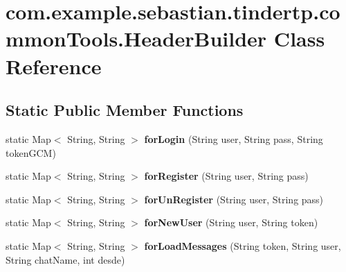 \hypertarget{classcom_1_1example_1_1sebastian_1_1tindertp_1_1commonTools_1_1HeaderBuilder}{}\section{com.\+example.\+sebastian.\+tindertp.\+common\+Tools.\+Header\+Builder Class Reference}
\label{classcom_1_1example_1_1sebastian_1_1tindertp_1_1commonTools_1_1HeaderBuilder}
\subsection*{Static Public Member Functions}
\begin{DoxyCompactItemize}
\item 
static Map$<$ String, String $>$ {\bfseries for\+Login} (String user, String pass, String token\+G\+CM)\hypertarget{classcom_1_1example_1_1sebastian_1_1tindertp_1_1commonTools_1_1HeaderBuilder_a7575f450c10545951cee7368e2978b8a}{}\label{classcom_1_1example_1_1sebastian_1_1tindertp_1_1commonTools_1_1HeaderBuilder_a7575f450c10545951cee7368e2978b8a}

\item 
static Map$<$ String, String $>$ {\bfseries for\+Register} (String user, String pass)\hypertarget{classcom_1_1example_1_1sebastian_1_1tindertp_1_1commonTools_1_1HeaderBuilder_aca86d388674ec18b8442236880026ffc}{}\label{classcom_1_1example_1_1sebastian_1_1tindertp_1_1commonTools_1_1HeaderBuilder_aca86d388674ec18b8442236880026ffc}

\item 
static Map$<$ String, String $>$ {\bfseries for\+Un\+Register} (String user, String pass)\hypertarget{classcom_1_1example_1_1sebastian_1_1tindertp_1_1commonTools_1_1HeaderBuilder_a065d39d2a2e8d2959c55dcd1edc0fb88}{}\label{classcom_1_1example_1_1sebastian_1_1tindertp_1_1commonTools_1_1HeaderBuilder_a065d39d2a2e8d2959c55dcd1edc0fb88}

\item 
static Map$<$ String, String $>$ {\bfseries for\+New\+User} (String user, String token)\hypertarget{classcom_1_1example_1_1sebastian_1_1tindertp_1_1commonTools_1_1HeaderBuilder_a77b03d39f2158637bfa92d2a67751dfa}{}\label{classcom_1_1example_1_1sebastian_1_1tindertp_1_1commonTools_1_1HeaderBuilder_a77b03d39f2158637bfa92d2a67751dfa}

\item 
static Map$<$ String, String $>$ {\bfseries for\+Load\+Messages} (String token, String user, String chat\+Name, int desde)\hypertarget{classcom_1_1example_1_1sebastian_1_1tindertp_1_1commonTools_1_1HeaderBuilder_a331d7f32ce59ed020c95f72ed57b1a0b}{}\label{classcom_1_1example_1_1sebastian_1_1tindertp_1_1commonTools_1_1HeaderBuilder_a331d7f32ce59ed020c95f72ed57b1a0b}


\end{DoxyCompactItemize}
